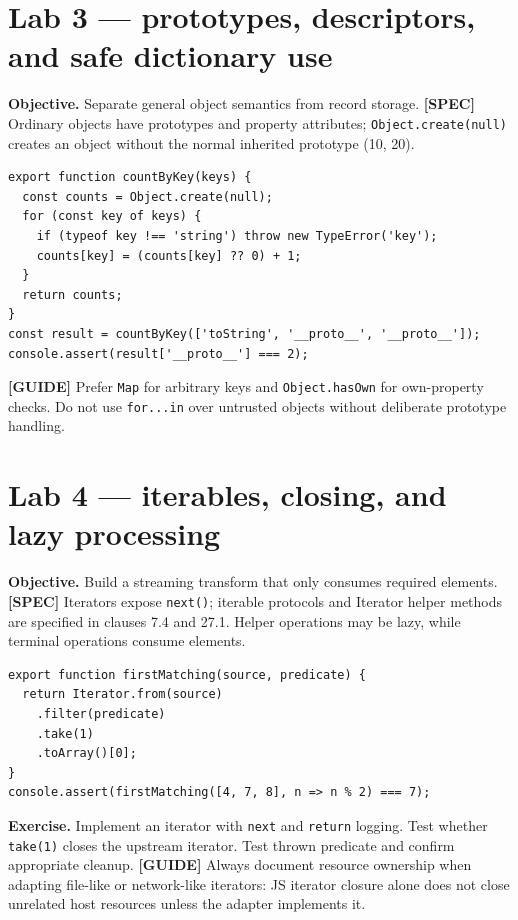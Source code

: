 \documentclass[11pt,letterpaper]{article}
\newcommand{\passthrough}[1]{#1}
\begin{document}
\section{Lab 3 --- prototypes, descriptors, and safe dictionary use}\label{lab-3-prototypes-descriptors-and-safe-dictionary-use}

\textbf{Objective.} Separate general object semantics from record storage. \textbf{{[}SPEC{]}} Ordinary objects have prototypes and property attributes; \passthrough{\lstinline!Object.create(null)!} creates an object without the normal inherited prototype (10, 20).

\begin{lstlisting}
export function countByKey(keys) {
  const counts = Object.create(null);
  for (const key of keys) {
    if (typeof key !== 'string') throw new TypeError('key');
    counts[key] = (counts[key] ?? 0) + 1;
  }
  return counts;
}
const result = countByKey(['toString', '__proto__', '__proto__']);
console.assert(result['__proto__'] === 2);
\end{lstlisting}

\textbf{{[}GUIDE{]}} Prefer \passthrough{\lstinline!Map!} for arbitrary keys and \passthrough{\lstinline!Object.hasOwn!} for own-property checks. Do not use \passthrough{\lstinline!for...in!} over untrusted objects without deliberate prototype handling.

\section{Lab 4 --- iterables, closing, and lazy processing}\label{lab-4-iterables-closing-and-lazy-processing}

\textbf{Objective.} Build a streaming transform that only consumes required elements. \textbf{{[}SPEC{]}} Iterators expose \passthrough{\lstinline!next()!}; iterable protocols and Iterator helper methods are specified in clauses 7.4 and 27.1. Helper operations may be lazy, while terminal operations consume elements.

\begin{lstlisting}
export function firstMatching(source, predicate) {
  return Iterator.from(source)
    .filter(predicate)
    .take(1)
    .toArray()[0];
}
console.assert(firstMatching([4, 7, 8], n => n % 2) === 7);
\end{lstlisting}

\textbf{Exercise.} Implement an iterator with \passthrough{\lstinline!next!} and \passthrough{\lstinline!return!} logging. Test whether \passthrough{\lstinline!take(1)!} closes the upstream iterator. Test thrown predicate and confirm appropriate cleanup. \textbf{{[}GUIDE{]}} Always document resource ownership when adapting file-like or network-like iterators: JS iterator closure alone does not close unrelated host resources unless the adapter implements it.
\end{document}
